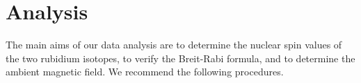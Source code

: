 \documentclass{../lab}
\begin{document}


\section{Analysis}


The main aims of our data analysis are to determine the nuclear spin values of the two rubidium isotopes, to verify the Breit-Rabi formula, and to determine the ambient magnetic field.  We recommend the following procedures.
\end{document}
